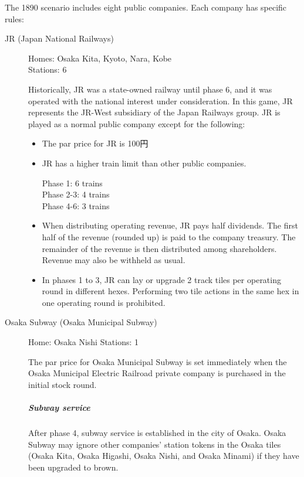 \begin{multicols}{2}
The 1890 scenario includes eight public companies. Each company has
specific rules:

\begin{description}
\item[JR (Japan National Railways)] \hfill

Homes: Osaka Kita, Kyoto, Nara, Kobe \\
Stations: 6

Historically, JR was a state-owned railway until phase 6, and it was
operated with the national interest under consideration. In this game,
JR represents the JR-West subsidiary of the Japan Railways group. JR
is played as a normal public company except for the following:
\begin{itemize}
\item The par price for JR is 100円

\item JR has a higher train limit than other public companies.

Phase 1: 6 trains\\
Phase 2-3: 4 trains\\
Phase 4-6: 3 trains

\item When distributing operating revenue, JR pays half
  dividends. The first half of the revenue (rounded up) is paid to the
  company treasury. The remainder of the revenue is then distributed
  among shareholders. Revenue may also be withheld as usual.

\item In phases 1 to 3, JR can lay or upgrade 2 track tiles per
  operating round in different hexes. Performing two tile actions in
  the same hex in one operating round is prohibited.
\end{itemize}

\item[Osaka Subway (Osaka Municipal Subway)] \hfill \label{osaka-subway}

Home: Osaka Nishi \hfill Stations: 1

The par price for Osaka Municipal Subway is set immediately when the
Osaka Municipal Electric Railroad private company is purchased in the
initial stock round.

\subparagraph{Subway service}
After phase 4, subway service is established in the city of
Osaka. Osaka Subway may ignore other companies' station tokens in the
Osaka tiles (Osaka Kita, Osaka Higashi, Osaka Nishi, and Osaka Minami)
if they have been upgraded to brown.


\end{description}
\end{multicols}
